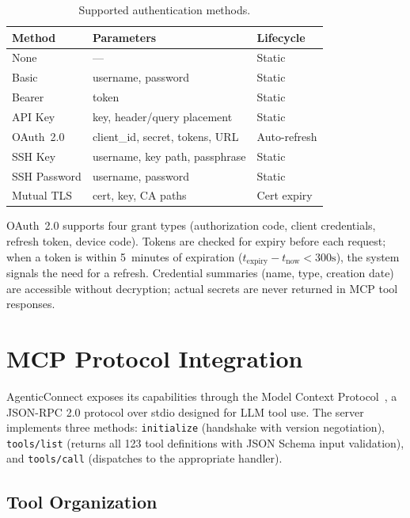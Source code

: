 \documentclass[10pt, twocolumn]{article}
\begin{document}
\begin{table}[h]
\caption{Supported authentication methods.}
\label{tab:auth}
\centering
\scriptsize
\begin{tabular}{@{}lll@{}}
\toprule
\textbf{Method} & \textbf{Parameters} & \textbf{Lifecycle} \\
\midrule
None & --- & Static \\
Basic & username, password & Static \\
Bearer & token & Static \\
API Key & key, header/query placement & Static \\
OAuth~2.0 & client\_id, secret, tokens, URL & Auto-refresh \\
SSH Key & username, key path, passphrase & Static \\
SSH Password & username, password & Static \\
Mutual TLS & cert, key, CA paths & Cert expiry \\
\bottomrule
\end{tabular}
\end{table}

OAuth~2.0 supports four grant types (authorization code, client credentials, refresh token, device code). Tokens are checked for expiry before each request; when a token is within 5~minutes of expiration ($t_{\text{expiry}} - t_{\text{now}} < 300\text{s}$), the system signals the need for a refresh. Credential summaries (name, type, creation date) are accessible without decryption; actual secrets are never returned in MCP tool responses.

\section{MCP Protocol Integration}
\label{sec:mcp}

AgenticConnect exposes its capabilities through the Model Context Protocol~\cite{mcp2024}, a JSON-RPC 2.0 protocol over stdio designed for LLM tool use. The server implements three methods: \texttt{initialize} (handshake with version negotiation), \texttt{tools/list} (returns all 123 tool definitions with JSON Schema input validation), and \texttt{tools/call} (dispatches to the appropriate handler).

\subsection{Tool Organization}
\end{document}
